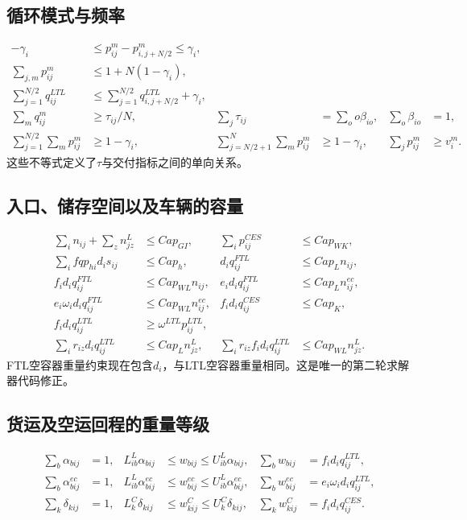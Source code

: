 \documentclass{article}
\begin{document}
\subsection*{循环模式与频率}
\begin{align}
-\gamma_i&\le p_{ij}^m-p_{i,j+N/2}^m\le\gamma_i,\\
\sum_{j,m}p_{ij}^m&\le1+N(1-\gamma_i),\\
\sum_{j=1}^{N/2}q_{ij}^{LTL}&\le
 \sum_{j=1}^{N/2}q_{i,j+N/2}^{LTL}+\gamma_i,\\
\sum_mq_{ij}^m&\ge\tau_{ij}/N,&
\sum_j\tau_{ij}&=\sum_o o\beta_{io},&
\sum_o\beta_{io}&=1,\\
\sum_{j=1}^{N/2}\sum_m p_{ij}^m&\ge1-\gamma_i,&
\sum_{j=N/2+1}^{N}\sum_m p_{ij}^m&\ge1-\gamma_i,&
\sum_jp_{ij}^m&\ge v_i^m.
\end{align}
这些不等式定义了$\tau$与交付指标之间的单向关系。

\subsection*{入口、储存空间以及车辆的容量}
\begin{align}
\sum_i n_{ij}+\sum_z n^L_{jz}&\le Cap_{GI},&
\sum_i p_{ij}^{CES}&\le Cap_{WK},\\
\sum_i fqp_{hi}d_i s_{ij}&\le Cap_h,&
d_iq_{ij}^{FTL}&\le Cap_L n_{ij},\\
f_i d_iq_{ij}^{FTL}&\le Cap_{WL}n_{ij},&
e_id_iq_{ij}^{FTL}&\le Cap_Ln^{ec}_{ij},\\
e_i\omega_i d_iq_{ij}^{FTL}&\le Cap_{WL}n^{ec}_{ij},&
f_id_iq_{ij}^{CES}&\le Cap_K,\\
f_id_iq_{ij}^{LTL}&\ge\omega^{LTL}p_{ij}^{LTL},\\
\sum_i r_{iz}d_iq_{ij}^{LTL}&\le Cap_Ln^L_{jz},&
\sum_i r_{iz}f_id_iq_{ij}^{LTL}&\le Cap_{WL}n^L_{jz}.
\end{align}
FTL空容器重量约束现在包含$d_i$，与LTL空容器重量相同。这是唯一的第二轮求解器代码修正。

\subsection*{货运及空运回程的重量等级}
\begin{align}
\sum_b\alpha_{bij}&=1,&
L^L_{ib}\alpha_{bij}&\le w_{bij}\le U^L_{ib}\alpha_{bij},&
\sum_bw_{bij}&=f_id_iq_{ij}^{LTL},\\
\sum_b\alpha^{ec}_{bij}&=1,&
L^L_{ib}\alpha^{ec}_{bij}&\le w^{ec}_{bij}\le U^L_{ib}\alpha^{ec}_{bij},&
\sum_bw^{ec}_{bij}&=e_i\omega_i d_iq_{ij}^{LTL},\\
\sum_k\delta_{kij}&=1,&
L^C_k\delta_{kij}&\le w^C_{kij}\le U^C_k\delta_{kij},&
\sum_kw^C_{kij}&=f_i d_iq_{ij}^{CES}.
\end{align}
\end{document}
